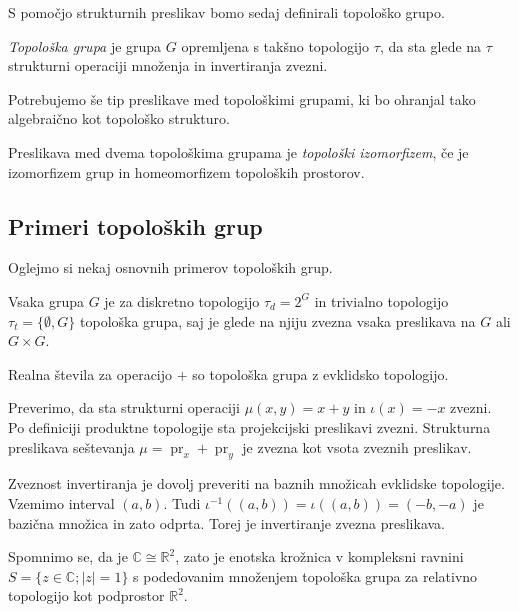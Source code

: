 \documentclass[mat1]{fmfdelo}
\newcommand{\R}{\mathbb R}
\newcommand{\C}{\mathbb C}
\DeclareMathOperator{\pr}{pr}
\begin{document}
S pomočjo strukturnih preslikav bomo sedaj definirali topološko grupo.
\begin{definicija}\label{def:topgrupa}
\emph{Topološka grupa} je grupa $G$ opremljena s takšno topologijo $\tau$, da sta glede na $\tau$ strukturni operaciji množenja in invertiranja zvezni. 
\end{definicija}

Potrebujemo še tip preslikave med topološkimi grupami, ki bo ohranjal tako algebraično kot topološko strukturo.
\begin{definicija}\label{def:topizo}
Preslikava med dvema topološkima grupama je \emph{to\-po\-loš\-ki izo\-mor\-fi\-zem}, če je izomorfizem grup in homeomorfizem topoloških prostorov.
\end{definicija}


\subsection{Primeri topoloških grup}
Oglejmo si nekaj osnovnih primerov topoloških grup.
\begin{primer}
	Vsaka grupa $G$ je za diskretno topologijo $\tau_d = 2^G$ in trivialno topologijo $\tau_t = \lbrace \emptyset, G \rbrace$ topološka grupa, saj je glede na njiju zvezna vsaka preslikava na $G$ ali $G \times G$.
\end{primer}

\begin{primer}
	Realna števila za operacijo $+$ so topološka grupa z evklidsko topologijo.
	
	Preverimo, da sta strukturni operaciji $\mu(x, y) = x + y$ in $\iota(x) = -x$ zvezni.
	Po definiciji produktne topologije sta projekcijski preslikavi zvezni. Strukturna preslikava seštevanja $\mu = \pr_x + \pr_y$ je zvezna kot vsota zveznih preslikav.
	
	Zveznost invertiranja je dovolj preveriti na baznih množicah evklidske topologije. Vzemimo interval $(a, b)$. Tudi $\iota^{-1}((a, b)) = \iota((a, b)) = (-b, -a)$ je bazična množica in zato odprta. Torej je invertiranje zvezna preslikava.
\end{primer}

\begin{primer}
	Spomnimo se, da je $\C \cong \R^2$, zato je
	enotska krožnica v kompleksni ravnini $S = \lbrace z \in \C ; |z| = 1 \rbrace$ s podedovanim množenjem topološka grupa za relativno topologijo kot podprostor $\R^2$.
\end{primer}
\end{document}
